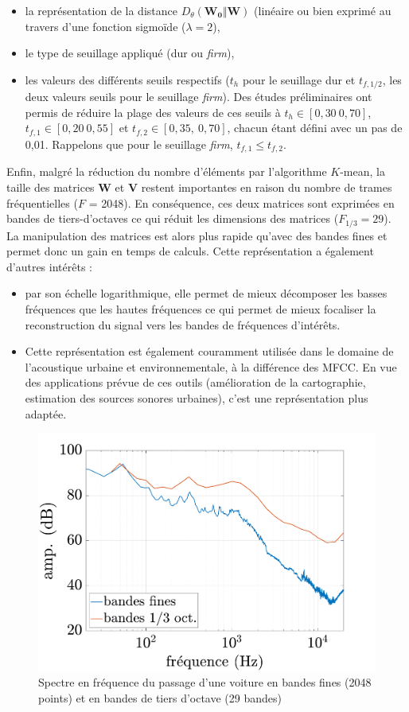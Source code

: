\begin{itemize}
\item la représentation de la distance $D_{\theta}(\mathbf{W_0}\Vert \mathbf{W})$ (linéaire ou bien exprimé au travers d'une fonction sigmoïde ($\lambda = 2$),
\item le type de seuillage appliqué (dur ou \textit{firm}),
\item les valeurs des différents seuils respectifs ($t_h$ pour le seuillage dur et $t_{f,1/2}$, les deux valeurs seuils pour le seuillage \textit{firm}). Des études préliminaires ont permis de réduire la plage des valeurs de ces seuils à $t_h \in \left[ 0,30~0,70 \right]$, $t_{f,1} \in \left[ 0,20~0,55 \right]$ et $t_{f,2} \in \left[ 0,35,~0,70 \right]$, chacun étant défini avec un pas de 0,01. Rappelons que pour le seuillage \textit{firm}, $t_{f,1} \leq t_{f,2}$.
\end{itemize}

Enfin, malgré la réduction du nombre d'éléments par l'algorithme $K$-mean, la taille des matrices $\mathbf{W}$ et $\mathbf{V}$ restent importantes en raison du nombre de trames fréquentielles ($F$ = 2048). En conséquence, ces deux matrices sont exprimées en bandes de tiers-d'octaves ce qui réduit les dimensions des matrices ($F_{1/3} = 29$). La manipulation des matrices est alors plus rapide qu'avec des bandes fines et permet donc un gain en temps de calculs. Cette représentation a également d'autres intérêts : 

\begin{itemize}
\item par son échelle logarithmique, elle permet de mieux décomposer les basses fréquences que les hautes fréquences ce qui permet de mieux focaliser la reconstruction du signal vers les bandes de fréquences d'intérêts.
\item Cette représentation est également couramment utilisée dans le domaine de l'acoustique urbaine et environnementale, à la différence des MFCC. En vue des applications prévue de ces outils (amélioration de la cartographie, estimation des sources sonores urbaines), c'est une représentation plus adaptée.
\end{itemize}

\begin{figure}[h]
\centering
\includegraphics[width=0.5\linewidth]{./figures/NMF/bande_fine_tiers.pdf}
\caption{Spectre en fréquence du passage d'une voiture en bandes fines (2048 points) et en bandes de tiers d'octave (29 bandes)}
\end{figure}


